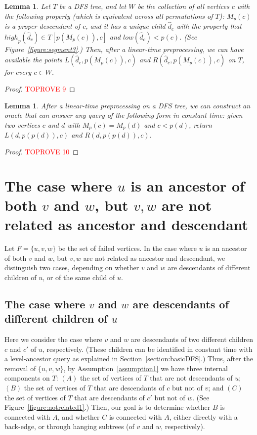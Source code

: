 \documentclass[11pt,a4paper]{article}
\newtheorem{lemma}[theorem]{Lemma}
\begin{document}
\begin{lemma}
\label{lemma:segmentpointsspecial}
Let $T$ be a DFS tree, and let $W$ be the collection of all vertices $c$ with the following property (which is equivalent across all permutations of $T$): $M_p(c)$ is a proper descendant of $c$, and it has a unique child $\hat{d}_c$ with the property that $\mathit{high}_p(\hat{d}_c)\in T[p(M_p(c)),c]$ and $\mathit{low}(\hat{d}_c)<p(c)$. (See Figure~\ref{figure:segment3}.) Then, after a linear-time preprocessing, we can have available the points $L(\hat{d}_c,p(M_p(c)),c)$ and $R(\hat{d}_c,p(M_p(c)),c)$ on $T$, for every $c\in W$.
\end{lemma}
\begin{proof}\textcolor{red}{TOPROVE 9}\end{proof}



\begin{lemma}
\label{lemma:segmentpointsMp}
After a linear-time preprocessing on a DFS tree, we can construct an oracle that can answer any query of the following form in constant time: given two vertices $c$ and $d$ with $M_p(c)=M_p(d)$ and $c<p(d)$, return $L(d,p(p(d)),c)$ and $R(d,p(p(d)),c)$.
\end{lemma}
\begin{proof}\textcolor{red}{TOPROVE 10}\end{proof}



\section{The case where $u$ is an ancestor of both $v$ and $w$, but $v,w$ are not related as ancestor and descendant}
\label{section:vwnotrelated}
Let $F=\{u,v,w\}$ be the set of failed vertices. In the case where $u$ is an ancestor of both $v$ and $w$, but $v,w$ are not related as ancestor and descendant, we distinguish two cases, depending on whether $v$ and $w$ are descendants of different children of $u$, or of the same child of $u$.

\subsection{The case where $v$ and $w$ are descendants of different children of $u$}
\label{section:vwdescendantsofcc'}
Here we consider the case where $v$ and $w$ are descendants of two different children $c$ and $c'$ of $u$, respectively. (These children can be identified in constant time with a level-ancestor query as explained in Section~\ref{section:basicDFS}.) Thus, after the removal of $\{u,v,w\}$, by Assumption~\ref{assumption1} we have three internal components on $T$: $(A)$ the set of vertices of $T$ that are not descendants of $u$; $(B)$ the set of vertices of $T$ that are descendants of $c$ but not of $v$; and $(C)$ the set of vertices of $T$ that are descendants of $c'$ but not of $w$. (See Figure~\ref{figure:notrelated1}.) Then, our goal is to determine whether $B$ is connected with $A$, and whether $C$ is connected with $A$, either directly with a back-edge, or through hanging subtrees (of $v$ and $w$, respectively).
\end{document}

